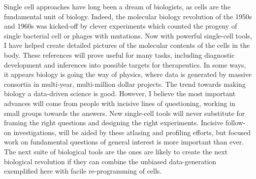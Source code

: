 Single cell approaches have long been a dream of biologists, as cells are the fundamental unit of biology. Indeed, the molecular biology revolution of the 1950s and 1960s was kicked-off by clever experiments which counted the progeny of single bacterial cell or phages with mutations. Now with powerful single-cell tools, I have helped create detailed pictures of the molecular contents of the cells in the body. These references will prove useful for many tasks, including diagnostic development and inferences into possible targets for therapeutics. In some ways, it appears biology is going the way of physics, where data is generated by massive consortia in multi-year, multi-million dollar projects. The trend towards making biology a data-driven science is good. However, I believe the most important advances will come from people with incisive lines of questioning, working in small groups towards the answers. New single-cell tools will never substitute for framing the right questions and designing the right experiments. Incisive follow-on investigations, will be aided by these atlasing and profiling efforts, but focused work on fundamental questions of general interest is more important than ever. The next suite of biological tools are the ones are likely to create the next biological revolution if they can combine the unbiased data-generation exemplified here with facile re-programming of cells.      
